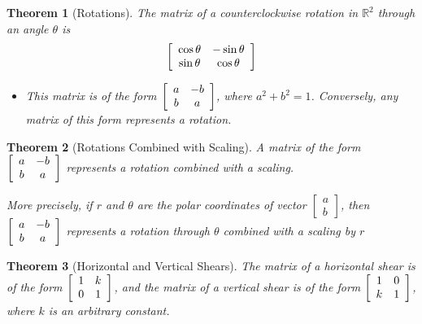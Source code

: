 \documentclass[10pt]{report}
\newtheorem{thm2}{Theorem}[section]
\begin{document}
\begin{thm2}[Rotations]
The matrix of a counterclockwise rotation in $\mathbb{R}^2$ through an angle $\theta$ is
$$\left[ \begin{array}{c c}
\cos\theta & -\sin\theta\\
\sin\theta & \cos\theta
\end{array}\right]$$
\begin{itemize}
\item[Note:] This matrix is of the form $\left[ \begin{array}{c c}
a & -b\\
b & a
\end{array}\right]$, where $a^2 + b^2 = 1$. Conversely, any matrix of this form represents a rotation.
\end{itemize}
\end{thm2}
\begin{thm2}[Rotations Combined with Scaling]
A matrix of the form $\left[ \begin{array}{c c}
a & -b\\
b & a
\end{array}\right]$ represents a rotation combined with a scaling.

More precisely, if $r$ and $\theta$ are the polar coordinates of vector $\left[ \begin{array}{c}
a\\
b
\end{array}\right]$, then $\left[ \begin{array}{c c}
a & -b\\
b & a
\end{array}\right]$ represents a rotation through $\theta$ combined with a scaling by $r$
\end{thm2}
\begin{thm2}[Horizontal and Vertical Shears]
The matrix of a horizontal shear is of the form $\left[ \begin{array}{c c}
1 & k\\
0 & 1
\end{array}\right]$, and the matrix of a vertical shear is of the form $\left[ \begin{array}{c c}
1 & 0\\
k & 1
\end{array}\right]$, where $k$ is an arbitrary constant.
\end{thm2}
\end{document}
